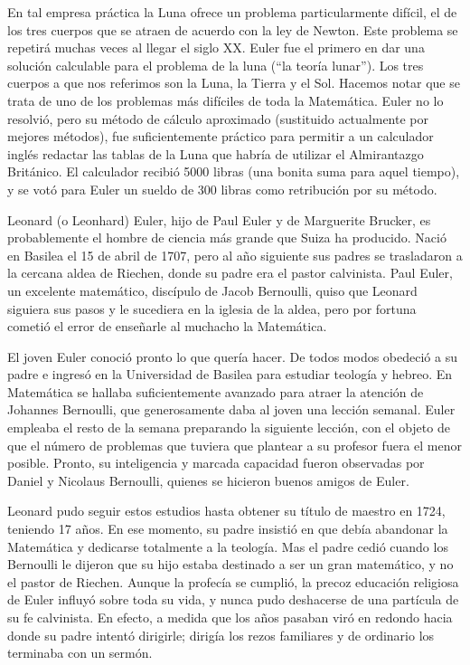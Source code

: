 \documentclass[a4paper, 12pt]{article}
\begin{document}
En tal empresa práctica la Luna ofrece un problema particularmente difícil, el de los tres cuerpos que se atraen de acuerdo con la ley de Newton. Este problema se repetirá muchas veces al llegar el siglo XX. Euler fue el primero en dar una solución calculable para el problema de la luna (``la teoría lunar''). Los tres cuerpos a que nos referimos son la Luna, la Tierra y el Sol. Hacemos notar que se trata de uno de los problemas más difíciles de toda la Matemática. Euler no lo resolvió, pero su método de cálculo aproximado (sustituido actualmente por mejores métodos), fue suficientemente práctico para permitir a un calculador inglés redactar las tablas de la Luna que habría de utilizar el Almirantazgo Británico. El calculador recibió 5000 libras (una bonita suma para aquel tiempo), y se votó para Euler un sueldo de 300 libras como retribución por su método.

Leonard (o Leonhard) Euler, hijo de Paul Euler y de Marguerite Brucker, es probablemente el hombre de ciencia más grande que Suiza ha producido. Nació en Basilea el 15 de abril de 1707, pero al año siguiente sus padres se trasladaron a la cercana aldea de Riechen, donde su padre era el pastor calvinista. Paul Euler, un excelente matemático, discípulo de Jacob Bernoulli, quiso que Leonard siguiera sus pasos y le sucediera en la iglesia de la aldea, pero por fortuna cometió el error de enseñarle al muchacho la Matemática.

El joven Euler conoció pronto lo que quería hacer. De todos modos obedeció a su padre e ingresó en la Universidad de Basilea para estudiar teología y hebreo. En Matemática se hallaba suficientemente avanzado para atraer la atención de Johannes Bernoulli, que generosamente daba al joven una lección semanal. Euler empleaba el resto de la semana preparando la siguiente lección, con el objeto de que el número de problemas que tuviera que plantear a su profesor fuera el menor posible. Pronto, su inteligencia y marcada capacidad fueron observadas por Daniel y Nicolaus Bernoulli, quienes se hicieron buenos amigos de Euler.

Leonard pudo seguir estos estudios hasta obtener su título de maestro en 1724, teniendo 17 años. En ese momento, su padre insistió en que debía abandonar la Matemática y dedicarse totalmente a la teología. Mas el padre cedió cuando los Bernoulli le dijeron que su hijo estaba destinado a ser un gran matemático, y no el pastor de Riechen. Aunque la profecía se cumplió, la precoz educación religiosa de Euler influyó sobre toda su vida, y nunca pudo deshacerse de una partícula de su fe calvinista. En efecto, a medida que los años pasaban viró en redondo hacia donde su padre intentó dirigirle; dirigía los rezos familiares y de ordinario los terminaba con un sermón.
\end{document}
